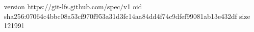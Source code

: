 version https://git-lfs.github.com/spec/v1
oid sha256:07064c4bbc08a53cf970f953a31d3fc14aa84dd4f74c9dfef99081ab13e432df
size 121991
